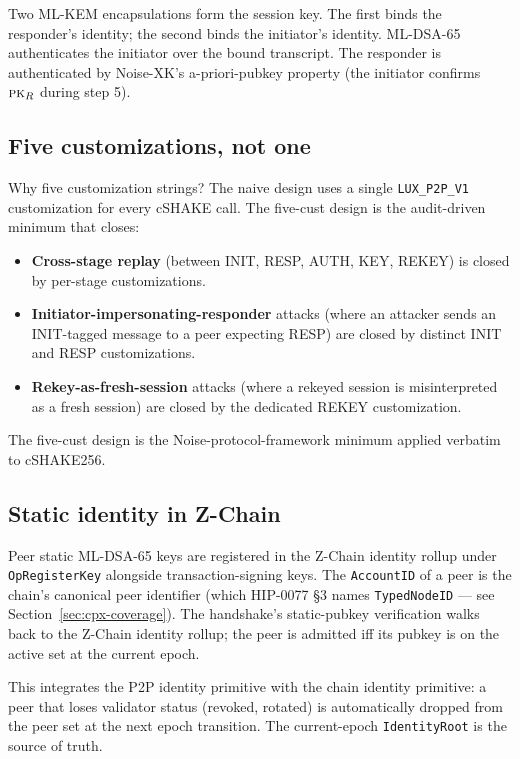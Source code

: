 Two ML-KEM encapsulations form the session key. The first binds the
responder's identity; the second binds the initiator's identity. ML-DSA-65
authenticates the initiator over the bound transcript. The responder is
authenticated by Noise-XK's a-priori-pubkey property (the initiator confirms
$\textsc{pk}_R$ during step 5).

\subsection{Five customizations, not one}

Why five customization strings? The naive design uses a single
\texttt{LUX\_P2P\_V1} customization for every cSHAKE call. The five-cust
design is the audit-driven minimum that closes:

\begin{itemize}[leftmargin=2em,nosep]
  \item \textbf{Cross-stage replay} (between INIT, RESP, AUTH, KEY, REKEY)
    is closed by per-stage customizations.
  \item \textbf{Initiator-impersonating-responder} attacks (where an
    attacker sends an INIT-tagged message to a peer expecting RESP) are
    closed by distinct INIT and RESP customizations.
  \item \textbf{Rekey-as-fresh-session} attacks (where a rekeyed session is
    misinterpreted as a fresh session) are closed by the dedicated REKEY
    customization.
\end{itemize}

The five-cust design is the Noise-protocol-framework minimum applied
verbatim to cSHAKE256.

\subsection{Static identity in Z-Chain}

Peer static ML-DSA-65 keys are registered in the Z-Chain identity rollup
under \texttt{OpRegisterKey} alongside transaction-signing keys. The
\texttt{AccountID} of a peer is the chain's canonical peer identifier (which
HIP-0077 §3 names \texttt{TypedNodeID} --- see
Section~\ref{sec:cpx-coverage}). The handshake's static-pubkey verification
walks back to the Z-Chain identity rollup; the peer is admitted iff its
pubkey is on the active set at the current epoch.

This integrates the P2P identity primitive with the chain identity primitive:
a peer that loses validator status (revoked, rotated) is automatically
dropped from the peer set at the next epoch transition. The current-epoch
\texttt{IdentityRoot} is the source of truth.

